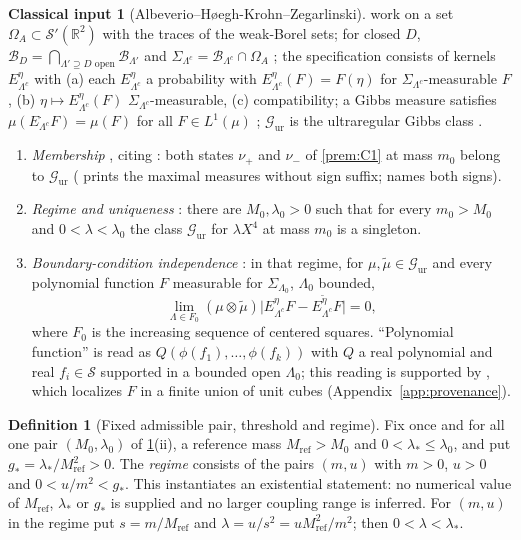 \documentclass[11pt]{article}
\theoremstyle{plain}
\theoremstyle{definition}
\newtheorem{definition}[theorem]{Definition}
\newtheorem{classical}{Classical input}
\theoremstyle{remark}
\newcommand{\R}{\mathbb{R}}
\newcommand{\cB}{\mathcal{B}}
\newcommand{\cG}{\mathcal{G}}
\newcommand{\cS}{\mathcal{S}}
\begin{document}
\begin{classical}[Albeverio--H{\o}egh-Krohn--Zegarlinski]\label{prem:C2}
\cite{AHKZ1989} work on a set $\Omega_A\subset\cS'(\R^{2})$ with the traces of the
weak-Borel sets; for closed $D$, $\cB_D=\bigcap_{\Lambda'\supseteq D\text{ open}}\cB_{\Lambda'}$
and $\Sigma_{\Lambda^{c}}=\cB_{\Lambda^{c}}\cap\Omega_A$ \cite[p.~684]{AHKZ1989}; the
specification consists of kernels $E^{\eta}_{\Lambda^{c}}$ with (a) each
$E^{\eta}_{\Lambda^{c}}$ a probability with $E^{\eta}_{\Lambda^{c}}(F)=F(\eta)$ for
$\Sigma_{\Lambda^{c}}$-measurable $F$, (b) $\eta\mapsto E^{\eta}_{\Lambda^{c}}(F)$
$\Sigma_{\Lambda^{c}}$-measurable, (c) compatibility; a Gibbs measure satisfies
$\mu(E^{\cdot}_{\Lambda^c}F)=\mu(F)$ for all $F\in L^{1}(\mu)$
\cite[(7)--(8), p.~686]{AHKZ1989}; $\cG_{\mathrm{ur}}$ is the ultraregular Gibbs
class \cite[(10)--(12), p.~686]{AHKZ1989}.
\begin{enumerate}[label=(\roman*)]
\item \emph{Membership} \cite[pp.~686--687]{AHKZ1989}, citing
  \cite[Thm.~7.2]{FS1977}: both states $\nu_+$ and $\nu_-$ of \ref{prem:C1} at
  mass $m_0$ belong to $\cG_{\mathrm{ur}}$ (\cite{AHKZ1989} prints the maximal
  measures without sign suffix; \cite[Thm.~7.2]{FS1977} names both signs).
\item \emph{Regime and uniqueness} \cite[Theorem, p.~687; after (47), p.~691]{AHKZ1989}:
  there are $M_0,\lambda_0>0$ such that for every $m_0>M_0$ and $0<\lambda<\lambda_0$
  the class $\cG_{\mathrm{ur}}$ for $\lambda X^{4}$ at mass $m_0$ is a singleton.
\item \emph{Boundary-condition independence} \cite[(13)--(14), p.~687; completed
  p.~691]{AHKZ1989}: in that regime, for $\mu,\tilde\mu\in\cG_{\mathrm{ur}}$ and every
  polynomial function $F$ measurable for $\Sigma_{\Lambda_0}$, $\Lambda_0$ bounded,
  \[
  \lim_{\Lambda\in F_0}(\mu\otimes\tilde\mu)\bigl|E^{\eta}_{\Lambda^{c}}F-E^{\tilde\eta}_{\Lambda^{c}}F\bigr|=0,
  \]
  where $F_0$ is the increasing sequence of centered squares. ``Polynomial
  function'' is read as $Q(\phi(f_1),\dots,\phi(f_k))$ with $Q$ a real polynomial
  and real $f_i\in\cS$ supported in a bounded open $\Lambda_0$; this reading is
  supported by \cite[p.~689, after (31)]{AHKZ1989}, which localizes $F$ in a
  finite union of unit cubes (Appendix~\ref{app:provenance}).
\end{enumerate}
\end{classical}

\begin{definition}[Fixed admissible pair, threshold and regime]\label{def:threshold}
Fix once and for all one pair $(M_0,\lambda_0)$ of \ref{prem:C2}(ii), a reference
mass $M_{\mathrm{ref}}>M_0$ and $0<\lambda_*\le\lambda_0$, and put
$g_{*}=\lambda_*/M_{\mathrm{ref}}^{2}>0$. The \emph{regime} consists of the pairs
$(m,u)$ with $m>0$, $u>0$ and $0<u/m^{2}<g_{*}$. This instantiates an existential
statement: no numerical value of $M_{\mathrm{ref}}$, $\lambda_*$ or $g_*$ is
supplied and no larger coupling range is inferred. For $(m,u)$ in the regime put
$s=m/M_{\mathrm{ref}}$ and $\lambda=u/s^{2}=uM_{\mathrm{ref}}^{2}/m^{2}$; then
$0<\lambda<\lambda_*$.
\end{definition}
\end{document}

